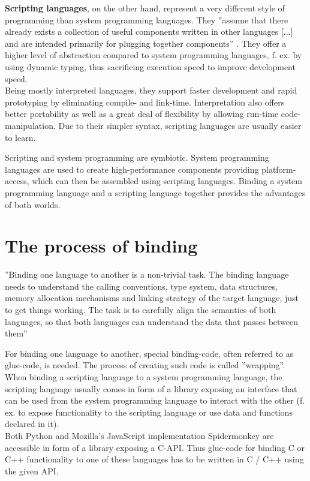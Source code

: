 \textbf{Scripting languages}, on the other hand, represent a very different style of programming than system programming languages. They ''assume that there already exists a collection of useful components written in other languages [...] and are intended primarily for plugging together components'' . They offer a higher level of abstraction compared to system programming languages, f. ex. by using dynamic typing, thus sacrificing execution speed to improve development speed.\\ Being mostly interpreted languages, they support faster development and rapid prototyping by eliminating compile- and link-time. Interpretation also offers better portability as well as a great deal of flexibility by allowing run-time code-manipulation. Due to their simpler syntax, scripting languages are usually easier to learn.

Scripting and system programming are symbiotic. System programming languages are used to create high-performance components providing platform-access, which can then be assembled using scripting languages. Binding a system programming language and a scripting language together provides the advantages of both worlds.


\section{The process of binding}

''Binding one language to another is a non-trivial task. The binding language needs to understand the calling conventions, type system, data structures, memory allocation mechanisms and linking strategy of the target language, just to get things working. The task is to carefully align the semantics of both languages, so that both languages can understand the data that passes between them''

For binding one language to another, special binding-code, often referred to as glue-code, is needed. The process of creating such code is called ''wrapping''. When binding a scripting language to a system programming language, the scripting language usually comes in form of a library exposing an interface that can be used from the system programming language to interact with the other (f. ex. to expose functionality to the scripting language or use data and functions declared in it).\\
Both Python and Mozilla's JavaScript implementation Spidermonkey are accessible in form of a library exposing a C-API. Thus glue-code for binding C or C++ functionality to one of these languages has to be written in C / C++ using the given API.


